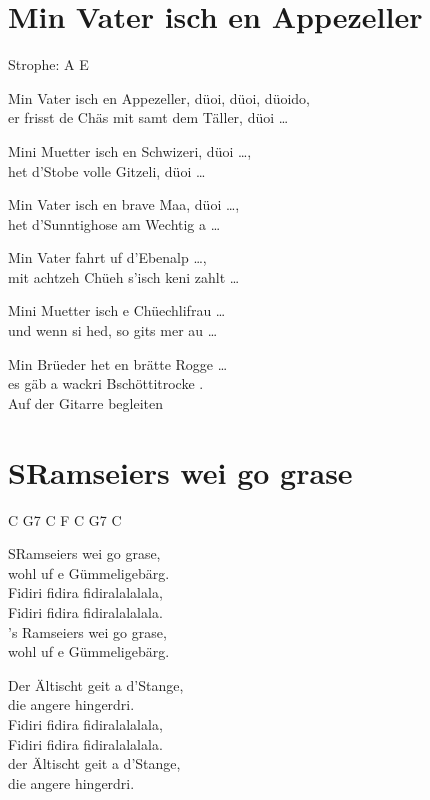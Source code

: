 \documentclass[
  letterpaper,
]{scrbook}
\begin{document}
\hypertarget{min-vater-isch-en-appezeller}{%
\chapter{Min Vater isch en
Appezeller}\label{min-vater-isch-en-appezeller}}

Strophe: A E

Min Vater isch en Appezeller, düoi, düoi, düoido,\\
er frisst de Chäs mit samt dem Täller, düoi \ldots{}

Mini Muetter isch en Schwizeri, düoi \ldots,\\
het d'Stobe volle Gitzeli, düoi \ldots{}

Min Vater isch en brave Maa, düoi \ldots,\\
het d'Sunntighose am Wechtig a \ldots{}

Min Vater fahrt uf d'Ebenalp \ldots,\\
mit achtzeh Chüeh s'isch keni zahlt \ldots{}

Mini Muetter isch e Chüechlifrau \ldots{}\\
und wenn si hed, so git\textquotesingle s mer au \ldots{}

Min Brüeder het en brätte Rogge \ldots{}\\
es gäb a wackri Bschöttitrocke .\\
Auf der Gitarre begleiten

\hypertarget{sramseiers-wei-go-grase}{%
\chapter{S\textquotesingle Ramseiers wei go
grase}\label{sramseiers-wei-go-grase}}

C G7 C F C G7 C

S\textquotesingle Ramseiers wei go grase,\\
wohl uf e Gümmeligebärg.\\
Fidiri fidira fidiralalalala,\\
Fidiri fidira fidiralalalala.\\
's Ramseiers wei go grase,\\
wohl uf e Gümmeligebärg.

Der Ältischt geit a d'Stange,\\
die angere hingerdri.\\
Fidiri fidira fidiralalalala,\\
Fidiri fidira fidiralalalala.\\
der Ältischt geit a d'Stange,\\
die angere hingerdri.
\end{document}
